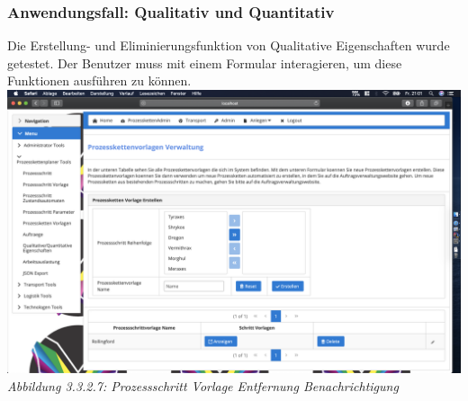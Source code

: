 \documentclass[enabledeprecatedfontcommands,fontsize=12pt,paper=a4,twoside]{scrartcl}
\begin{document}

\subsubsection{Anwendungsfall: Qualitativ und Quantitativ}
Die Erstellung- und Eliminierungsfunktion von Qualitative Eigenschaften wurde getestet. Der Benutzer muss mit einem Formular interagieren, um diese Funktionen ausführen zu können.\\
\hypertarget{sc3.3.3.7}{
\includegraphics[width=1\textwidth]{Screenshots/335Formular.png}
\textit{Abbildung 3.3.2.7: Prozessschritt Vorlage Entfernung Benachrichtigung}
}
\end{document}
